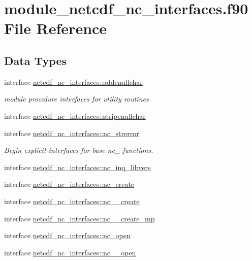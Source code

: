 \hypertarget{module__netcdf__nc__interfaces_8f90}{}\section{module\+\_\+netcdf\+\_\+nc\+\_\+interfaces.\+f90 File Reference}
\label{module__netcdf__nc__interfaces_8f90}
\subsection*{Data Types}
\begin{DoxyCompactItemize}
\item 
interface \hyperlink{interfacenetcdf__nc__interfaces_1_1addcnullchar}{netcdf\+\_\+nc\+\_\+interfaces\+::addcnullchar}
\begin{DoxyCompactList}\small\item\em module procedure interfaces for utility routines \end{DoxyCompactList}\item 
interface \hyperlink{interfacenetcdf__nc__interfaces_1_1stripcnullchar}{netcdf\+\_\+nc\+\_\+interfaces\+::stripcnullchar}
\item 
interface \hyperlink{interfacenetcdf__nc__interfaces_1_1nc__strerror}{netcdf\+\_\+nc\+\_\+interfaces\+::nc\+\_\+strerror}
\begin{DoxyCompactList}\small\item\em Begin explicit interfaces for base nc\+\_\+ functions. \end{DoxyCompactList}\item 
interface \hyperlink{interfacenetcdf__nc__interfaces_1_1nc__inq__libvers}{netcdf\+\_\+nc\+\_\+interfaces\+::nc\+\_\+inq\+\_\+libvers}
\item 
interface \hyperlink{interfacenetcdf__nc__interfaces_1_1nc__create}{netcdf\+\_\+nc\+\_\+interfaces\+::nc\+\_\+create}
\item 
interface \hyperlink{interfacenetcdf__nc__interfaces_1_1nc____create}{netcdf\+\_\+nc\+\_\+interfaces\+::nc\+\_\+\+\_\+create}
\item 
interface \hyperlink{interfacenetcdf__nc__interfaces_1_1nc____create__mp}{netcdf\+\_\+nc\+\_\+interfaces\+::nc\+\_\+\+\_\+create\+\_\+mp}
\item 
interface \hyperlink{interfacenetcdf__nc__interfaces_1_1nc__open}{netcdf\+\_\+nc\+\_\+interfaces\+::nc\+\_\+open}
\item 
interface \hyperlink{interfacenetcdf__nc__interfaces_1_1nc____open}{netcdf\+\_\+nc\+\_\+interfaces\+::nc\+\_\+\+\_\+open}

\end{DoxyCompactItemize}

